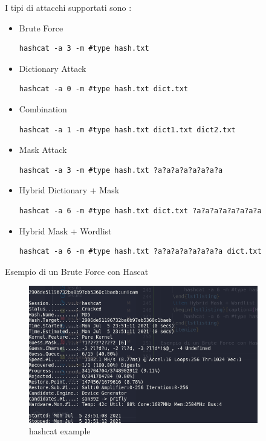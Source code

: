 I tipi di attacchi supportati sono :
\begin{itemize}
    \item Brute Force
    \begin{lstlisting}[caption={Hashcat Brute Force}, style=javaScriptCode]
        hashcat -a 3 -m #type hash.txt 
    \end{lstlisting}
    \item Dictionary Attack
    \begin{lstlisting}[caption={Hashcat Dictionary}, style=javaScriptCode]
        hashcat -a 0 -m #type hash.txt dict.txt 
    \end{lstlisting}
    \item Combination
    \begin{lstlisting}[caption={Hashcat Combination}, style=javaScriptCode]
        hashcat -a 1 -m #type hash.txt dict1.txt dict2.txt
    \end{lstlisting}
    \item Mask Attack
    \begin{lstlisting}[caption={Hashcat Mask}, style=javaScriptCode]
        hashcat -a 3 -m #type hash.txt ?a?a?a?a?a?a?a?a
    \end{lstlisting}
    \item Hybrid Dictionary + Mask
    \begin{lstlisting}[caption={Hashcat Hybrid Dictionary + Mask}, style=javaScriptCode]
        hashcat -a 6 -m #type hash.txt dict.txt ?a?a?a?a?a?a?a?a
    \end{lstlisting}
    \item Hybrid Mask + Wordlist
    \begin{lstlisting}[caption={Hashcat Hybrid Mask + Wordlist}, style=javaScriptCode]
        hashcat -a 6 -m #type hash.txt ?a?a?a?a?a?a?a?a dict.txt
    \end{lstlisting}
\end{itemize}

Esempio di un Brute Force con Hascat 

\begin{figure}[h!]
	\centering
	\includegraphics[width=100mm]{Immagini/1/hashcat_show.png}
	\caption{hashcat example}
    \label{fig:hashcat example}
\end{figure}